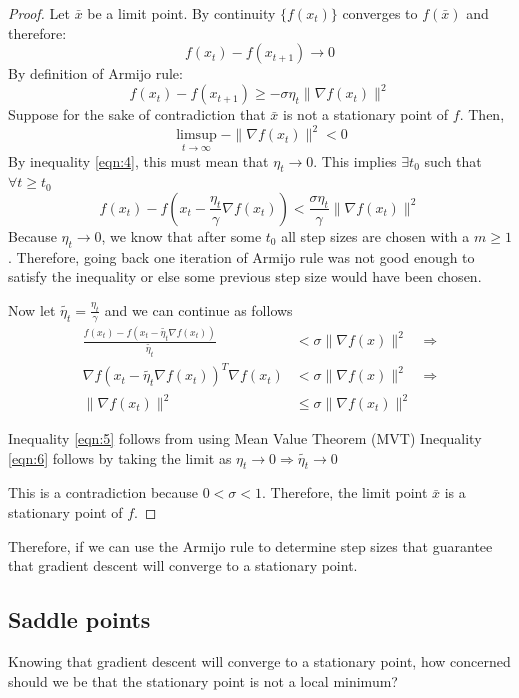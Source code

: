 \begin{proof}
Let $\bar{x}$ be a limit point. By continuity $\{f(x_t)\}$ converges to $f(\bar{x})$ and therefore:
\[
    f(x_t) - f(x_{t+1}) \to 0
\]
By definition of Armijo rule:
\begin{equation}
    f(x_t) - f(x_{t+1}) \ge -\sigma \eta_t \|\nabla f(x_t)\|^2 \label{eqn:4}
\end{equation}
Suppose for the sake of contradiction that $\bar{x}$ is not a stationary point of $f$. Then,
\[
    \limsup_{t \to \infty} -\|\nabla f(x_t)\|^2 < 0
\]
By inequality \ref{eqn:4}, this must mean that $\eta_t \to 0$. This implies $\exists t_0$ such that $\forall t \ge t_0$
\[
    f(x_t) - f(x_t - \frac{\eta_t}{\gamma} \nabla f(x_t)) < \frac{\sigma \eta_t}{\gamma} \|\nabla f(x_t)\|^2
\]
Because $\eta_t \to 0$, we know that after some $t_0$ all step sizes are chosen with a $m\ge 1$. Therefore, going back one iteration of Armijo rule was not good enough to satisfy the inequality or else some previous step size would have been chosen.

Now let $\tilde{\eta_t} = \frac{\eta_t}{\gamma}$ and we can continue as follows
\begin{align}
    \frac{f(x_t) - f(x_t - \tilde{\eta_t} \nabla f(x_t))}{\tilde{\eta_t}} &< \sigma \|\nabla f(x)\|^2 &\Rightarrow \nonumber\\
    \nabla f(x_t - \tilde{\eta_t} \nabla f(x_t))^T \nabla f(x_t) &< \sigma \|\nabla f(x)\|^2 &\Rightarrow \label{eqn:5}\\
    \|\nabla f(x_t) \|^2 &\le \sigma \|\nabla f(x_t) \|^2 & \label{eqn:6}
\end{align}

Inequality \ref{eqn:5} follows from using Mean Value Theorem (MVT)
Inequality \ref{eqn:6} follows by taking the limit as $\eta_t \to 0 \Rightarrow \tilde{\eta_t} \to 0$

This is a contradiction because $0 < \sigma < 1$. Therefore, the limit point $\bar{x}$ is a stationary point of $f$.
\end{proof}
Therefore, if we can use the Armijo rule to determine step sizes that guarantee that gradient descent will converge to a stationary point.

\subsection{Saddle points}

Knowing that gradient descent will converge to a stationary point, how concerned
should we be that the stationary point is not a local minimum?

